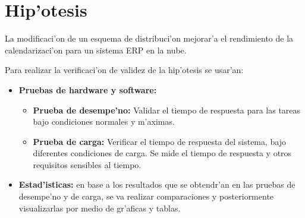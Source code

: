\section*{Hip'otesis}

La modificaci'on de un esquema de distribuci'on mejorar'a el rendimiento de la calendarizaci'on para un sistema ERP en la nube.

Para realizar la verificaci'on de validez de la hip'otesis se usar'an:


\begin{itemize}
	\item \textbf{Pruebas de hardware y software:}
	\begin{itemize}
	\item \textbf{Prueba de desempe'no:} Validar el tiempo de respuesta para las tareas bajo condiciones normales y m'aximas.
	\item \textbf{Prueba de carga:} Verificar el tiempo de respuesta del sistema, bajo diferentes condiciones de carga. Se mide el tiempo de respuesta y otros requisitos sensibles al tiempo.
	\end{itemize}
	\item \textbf{Estad'isticas:} en base a los resultados que se obtendr'an en las pruebas de desempe'no y de carga, se va realizar comparaciones y posteriormente visualizarlas por medio de gr'aficas y tablas.
\end{itemize}
